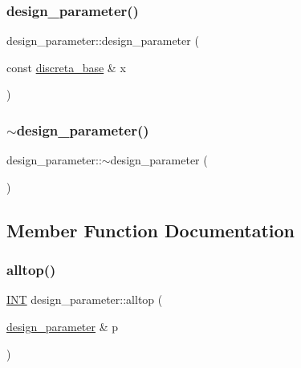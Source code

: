 \mbox{\label{classdesign__parameter_a4ea566da8e77452b92027b2a2c8df7ce}} 
\subsubsection{\texorpdfstring{design\+\_\+parameter()}{design\_parameter()}\hspace{0.1cm}{\footnotesize\ttfamily [2/2]}}
{\footnotesize\ttfamily design\+\_\+parameter\+::design\+\_\+parameter (\begin{DoxyParamCaption}\item[{const \mbox{\hyperlink{classdiscreta__base}{discreta\+\_\+base}} \&}]{x }\end{DoxyParamCaption})}

\mbox{\label{classdesign__parameter_af7927d3b3282e33daf8bf7106ffb3e96}} 
\subsubsection{\texorpdfstring{$\sim$design\+\_\+parameter()}{~design\_parameter()}}
{\footnotesize\ttfamily design\+\_\+parameter\+::$\sim$design\+\_\+parameter (\begin{DoxyParamCaption}{ }\end{DoxyParamCaption})}



\subsection{Member Function Documentation}
\mbox{\label{classdesign__parameter_ac91d8a483974702c826889aade83cd5f}} 
\subsubsection{\texorpdfstring{alltop()}{alltop()}}
{\footnotesize\ttfamily \mbox{\hyperlink{galois_8h_a09fddde158a3a20bd2dcadb609de11dc}{I\+NT}} design\+\_\+parameter\+::alltop (\begin{DoxyParamCaption}\item[{\mbox{\hyperlink{classdesign__parameter}{design\+\_\+parameter}} \&}]{p }\end{DoxyParamCaption})}


